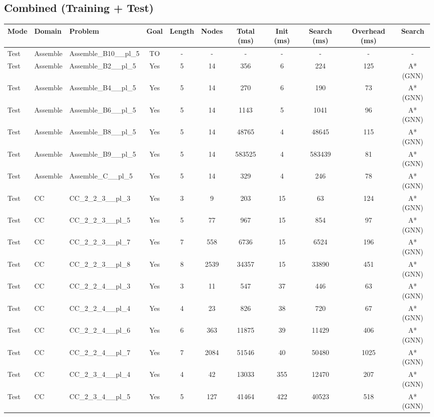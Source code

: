 \documentclass{article}
\begin{document}
\subsection*{Combined (Training + Test)}
\begin{tabular}{lllcccccccc}
\toprule
Mode & Domain & Problem & Goal & Length & Nodes & Total (ms) & Init (ms) & Search (ms) & Overhead (ms) & Search \\
\midrule
Test & Assemble & Assemble\_B10\_\_pl\_5 & TO & - & - & - & - & - & - & - \\
Test & Assemble & Assemble\_B2\_\_pl\_5 & Yes & 5 & 14 & 356 & 6 & 224 & 125 & A*(GNN) \\
Test & Assemble & Assemble\_B4\_\_pl\_5 & Yes & 5 & 14 & 270 & 6 & 190 & 73 & A*(GNN) \\
Test & Assemble & Assemble\_B6\_\_pl\_5 & Yes & 5 & 14 & 1143 & 5 & 1041 & 96 & A*(GNN) \\
Test & Assemble & Assemble\_B8\_\_pl\_5 & Yes & 5 & 14 & 48765 & 4 & 48645 & 115 & A*(GNN) \\
Test & Assemble & Assemble\_B9\_\_pl\_5 & Yes & 5 & 14 & 583525 & 4 & 583439 & 81 & A*(GNN) \\
Test & Assemble & Assemble\_C\_\_pl\_5 & Yes & 5 & 14 & 329 & 4 & 246 & 78 & A*(GNN) \\
Test & CC & CC\_2\_2\_3\_\_pl\_3 & Yes & 3 & 9 & 203 & 15 & 63 & 124 & A*(GNN) \\
Test & CC & CC\_2\_2\_3\_\_pl\_5 & Yes & 5 & 77 & 967 & 15 & 854 & 97 & A*(GNN) \\
Test & CC & CC\_2\_2\_3\_\_pl\_7 & Yes & 7 & 558 & 6736 & 15 & 6524 & 196 & A*(GNN) \\
Test & CC & CC\_2\_2\_3\_\_pl\_8 & Yes & 8 & 2539 & 34357 & 15 & 33890 & 451 & A*(GNN) \\
Test & CC & CC\_2\_2\_4\_\_pl\_3 & Yes & 3 & 11 & 547 & 37 & 446 & 63 & A*(GNN) \\
Test & CC & CC\_2\_2\_4\_\_pl\_4 & Yes & 4 & 23 & 826 & 38 & 720 & 67 & A*(GNN) \\
Test & CC & CC\_2\_2\_4\_\_pl\_6 & Yes & 6 & 363 & 11875 & 39 & 11429 & 406 & A*(GNN) \\
Test & CC & CC\_2\_2\_4\_\_pl\_7 & Yes & 7 & 2084 & 51546 & 40 & 50480 & 1025 & A*(GNN) \\
Test & CC & CC\_2\_3\_4\_\_pl\_4 & Yes & 4 & 42 & 13033 & 355 & 12470 & 207 & A*(GNN) \\
Test & CC & CC\_2\_3\_4\_\_pl\_5 & Yes & 5 & 127 & 41464 & 422 & 40523 & 518 & A*(GNN) \\

\end{tabular}
\end{document}

